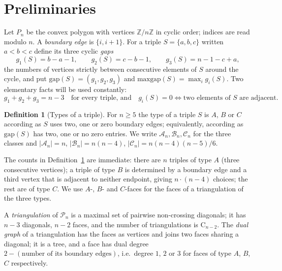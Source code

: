 \documentclass[11pt,a4paper]{article}
\theoremstyle{definition}
\newtheorem{definition}[theorem]{Definition}
\newcommand{\Pol}{\mathcal{P}}
\newcommand{\Zn}{\mathbb{Z}}
\newcommand{\Cat}{\mathrm{C}}
\newcommand{\gap}{\mathrm{gap}}
\newcommand{\maxgap}{\mathrm{maxgap}}
\begin{document}
\section{Preliminaries}\label{sec:prelim}

Let $P_n$ be the convex polygon with vertices $\Zn/n\Zn$ in cyclic order; indices
are read modulo $n$. A \emph{boundary edge} is $\{i, i+1\}$. For a triple
$S = \{a, b, c\}$ written $a < b < c$ define its three cyclic \emph{gaps}
\begin{equation}\label{eq:gaps}
  g_1(S) = b - a - 1, \qquad g_2(S) = c - b - 1, \qquad g_3(S) = n - 1 - c + a,
\end{equation}
the numbers of vertices strictly between consecutive elements of $S$ around the
cycle, and put $\gap(S) = (g_1, g_2, g_3)$ and $\maxgap(S) = \max_i g_i(S)$.
Two elementary facts will be used constantly:
\begin{equation}\label{eq:gapsum}
  g_1 + g_2 + g_3 = n - 3 \quad \text{for every triple, and} \quad
  g_i(S) = 0 \iff \text{two elements of } S \text{ are adjacent}.
\end{equation}

\begin{definition}[Types of a triple]\label{def:types}
For $n \ge 5$ the type of a triple $S$ is $A$, $B$ or $C$ according as $S$ uses
two, one or zero boundary edges; equivalently, according as $\gap(S)$ has two,
one or no zero entries. We write $\mathcal{A}_n, \mathcal{B}_n, \mathcal{C}_n$ for
the three classes and $|\mathcal{A}_n| = n$, $|\mathcal{B}_n| = n(n-4)$,
$|\mathcal{C}_n| = n(n-4)(n-5)/6$.
\end{definition}

The counts in Definition~\ref{def:types} are immediate: there are $n$ triples of
type $A$ (three consecutive vertices); a triple of type $B$ is determined by a
boundary edge and a third vertex that is adjacent to neither endpoint, giving
$n \cdot (n-4)$ choices; the rest are of type $C$. We use $A$-, $B$- and
$C$-faces for the faces of a triangulation of the three types.

A \emph{triangulation} of $\Pol_n$ is a maximal set of pairwise non-crossing
diagonals; it has $n-3$ diagonals, $n-2$ faces, and the number of triangulations
is $\Cat_{n-2}$. The \emph{dual graph} of a triangulation has the faces as
vertices and joins two faces sharing a diagonal; it is a tree, and a face has
dual degree $2 - (\text{number of its boundary edges})$, i.e.\ degree $1$, $2$ or
$3$ for faces of type $A$, $B$, $C$ respectively.
\end{document}
